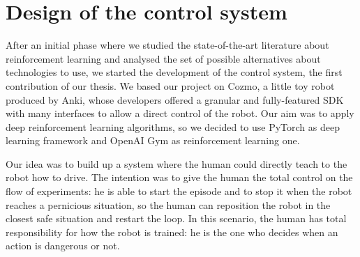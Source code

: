 \documentclass[10pt,twocolumn,letterpaper]{article}
\begin{document}

\section{Design of the control system}

After an initial phase where we studied the state-of-the-art literature about reinforcement learning and analysed the set of possible alternatives about technologies to use, we started the development of the control system, the first contribution of our thesis.
We based our project on Cozmo, a little toy robot produced by Anki, whose developers offered a granular and fully-featured SDK with many interfaces to allow a direct control of the robot. Our aim was to apply deep reinforcement learning algorithms, so we decided to use PyTorch as deep learning framework and OpenAI Gym as reinforcement learning one.

Our idea was to build up a system where the human could directly teach to the robot how to drive.
The intention was to give the human the total control on the flow of experiments: he is able to start the episode and to stop it when the robot reaches a pernicious situation, so the human can reposition the robot in the closest safe situation and restart the loop. In this scenario, the human has total responsibility for how the robot is trained: he is the one who decides when an action is dangerous or not.
\end{document}
